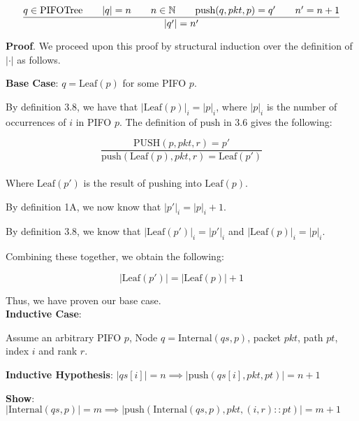 \documentclass{article}
\begin{document}
\par\

$$\frac{q \in \text{PIFOTree} \hspace{0.7cm} |q| = n \hspace{0.7cm} n \in \mathbb{N} \hspace{0.7cm} \text{push}(q, pkt, p) = q' \hspace{0.7cm} n' = n+1}{|q'| = n'}$$

\textbf{Proof}. We proceed upon this proof by structural induction over the definition of $|\cdot|$ as follows.\newline

\textbf{Base Case}: $q = \text{Leaf}(p)$ for some PIFO $p$.\newline

By definition 3.8, we have that $|\text{Leaf}(p)|_i = |p|_i$, where $|p|_i$ is the number of occurrences of $i$ in PIFO $p$. The definition of $\text{push}$ in 3.6 gives the following:

$$\frac{\text{PUSH}(p, pkt, r) = p'}{\text{push}(\text{Leaf}(p), pkt, r) = \text{Leaf}(p')}$$\\[-10pt]

Where $\text{Leaf}(p')$ is the result of $\text{push}$ing into $\text{Leaf}(p)$.\newline

By definition 1A, we now know that $|p'|_i = |p|_i + 1$.\newline

By definition 3.8, we know that $|\text{Leaf}(p')|_i = |p'|_i$ and $|\text{Leaf}(p)|_i = |p|_i$.\newline

Combining these together, we obtain the following:

$$|\text{Leaf}(p')| = |\text{Leaf}(p)| + 1$$

Thus, we have proven our base case.\\[10pt]

\textbf{Inductive Case}:\newline

Assume an arbitrary PIFO $p$, Node $q = \text{Internal}(qs, p)$, packet $pkt$, path $pt$, index $i$ and rank $r$.\newline

\textbf{Inductive Hypothesis}: $|qs[i]| = n \implies |\text{push}(qs[i], pkt, pt)| = n+1$\newline

\textbf{Show}: $|\text{Internal}(qs, p)| = m \implies |\text{push}(\text{Internal}(qs, p), pkt, (i, r) :: pt)| = m+1$\newline
\end{document}
